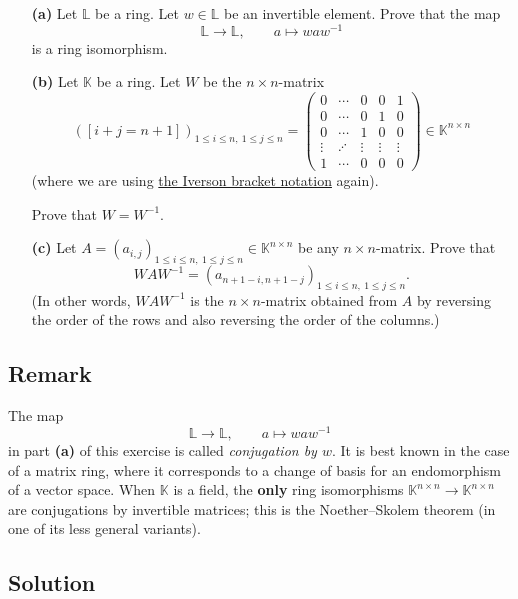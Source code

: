 \documentclass[paper=a4, fontsize=12pt]{scrartcl}%
\theoremstyle{plainsl}
\theoremstyle{definition}
\theoremstyle{remark}
\begin{document}
\begin{enumerate}
\item[\textbf{(a)}] Let $\mathbb{L}$ be a ring. Let $w \in\mathbb{L}$ be an
invertible element. Prove that the map
\[
\mathbb{L} \to\mathbb{L} , \qquad a \mapsto waw^{-1}
\]
is a ring isomorphism.

\item[\textbf{(b)}] Let $\mathbb{K}$ be a ring. Let $W$ be the $n \times
n$-matrix
\[
\left(  \left[  i + j = n + 1 \right]  \right)  _{1\leq i\leq n,\ 1\leq j\leq
n} =
\begin{pmatrix}
0 & \cdots & 0 & 0 & 1\\
0 & \cdots & 0 & 1 & 0\\
0 & \cdots & 1 & 0 & 0\\
\vdots & \iddots & \vdots & \vdots & \vdots\\
1 & \cdots & 0 & 0 & 0
\end{pmatrix}
\in\mathbb{K}^{n \times n}
\]
(where we are using \href{https://en.wikipedia.org/wiki/Iverson_bracket}{the
Iverson bracket notation} again).

Prove that $W = W^{-1}$.

\item[\textbf{(c)}] Let $A = \left(  a_{i,j} \right)  _{1\leq i\leq n,\ 1\leq
j\leq n} \in\mathbb{K}^{n \times n}$ be any $n \times n$-matrix. Prove that
\[
WAW^{-1} = \left(  a_{n+1-i,n+1-j} \right)  _{1\leq i\leq n,\ 1\leq j\leq n}.
\]
(In other words, $WAW^{-1}$ is the $n \times n$-matrix obtained from $A$ by
reversing the order of the rows and also reversing the order of the columns.)
\end{enumerate}

\subsection{Remark}

The map
\[
\mathbb{L} \to\mathbb{L} , \qquad a \mapsto waw^{-1}
\]
in part \textbf{(a)} of this exercise is called \textit{conjugation by $w$}.
It is best known in the case of a matrix ring, where it corresponds to a
change of basis for an endomorphism of a vector space. When $\mathbb{K}$ is a
field, the \textbf{only} ring isomorphisms $\mathbb{K}^{n \times n}
\to\mathbb{K}^{n \times n}$ are conjugations by invertible matrices; this is
the Noether--Skolem theorem (in one of its less general variants).

\subsection{Solution}
\end{document}
